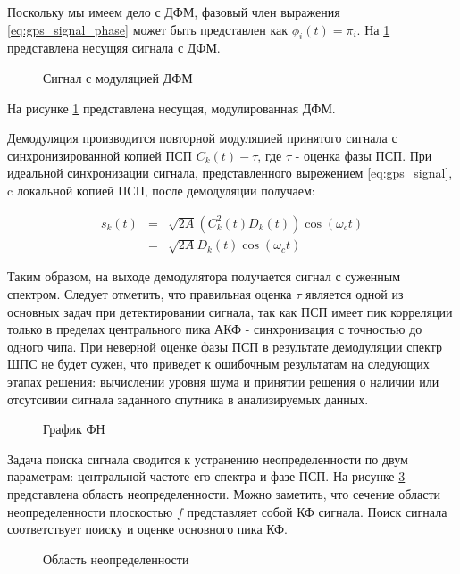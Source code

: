 Поскольку мы имеем дело с ДФМ, фазовый член выражения \ref{eq:gps_signal_phase} может быть представлен как
${\phi_{i}(t) = \pi_{i}}$. На \ref{pic:sec1_bpsk} представлена несущяя сигнала с ДФМ.

\begin{figure}[ht]
\center{}
\caption{Сигнал с модуляцией ДФМ}
\label{pic:sec1_bpsk}
\end{figure}
На рисунке \ref{pic:sec1_bpsk} представлена несущая, модулированная ДФМ.

Демодуляция производится повторной модуляцией принятого сигнала с синхронизированной копией ПСП ${C_k(t) - \tau}$, где
${\tau}$ - оценка фазы ПСП. При идеальной синхронизации сигнала, представленного вырежением \ref{eq:gps_signal},
c локальной копией ПСП, после демодуляции получаем:
\begin{center}
\begin{eqnarray}
	\label{eq:gps_signal_modulated}
	s_k(t) & = & \sqrt{2A}(C^2_k(t)D_k(t))\cos(\omega_{c}t) \nonumber \\
	& = &\sqrt{2A}D_k(t)\cos(\omega_{c}t)
\end{eqnarray}
\end{center}
Таким образом, на выходе демодулятора получается сигнал с суженным спектром. Следует отметить, что правильная оценка ${\tau}$
является одной из основных задач при детектировании сигнала, так как ПСП имеет пик корреляции только в пределах центрального пика
АКФ \cite{gold-ieee}  - синхронизация с точностью до одного чипа. При неверной оценке фазы ПСП в результате демодуляции спектр
ШПС не будет сужен, что приведет к ошибочным результатам на следующих этапах решения: вычислении уровня шума и принятии решения
о наличии или отсутсивии сигнала заданного спутника в анализируемых данных.

\begin{figure}[H]
\center{}
\caption{График ФН}
\label{pic:corr_peak}
\end{figure}

Задача поиска сигнала сводится к устранению неопределенности по двум параметрам: центральной частоте его спектра
и фазе ПСП. На рисунке \ref{pic:ambiguity_region} представлена область неопределенности. Можно заметить, что сечение
области неопределенности плоскостью ${f}$ представляет собой КФ сигнала. Поиск сигнала соответствует поиску и
оценке основного пика КФ.

\begin{figure}[H]
\center{}
\caption{Область неопределенности}
\label{pic:ambiguity_region}
\end{figure}

